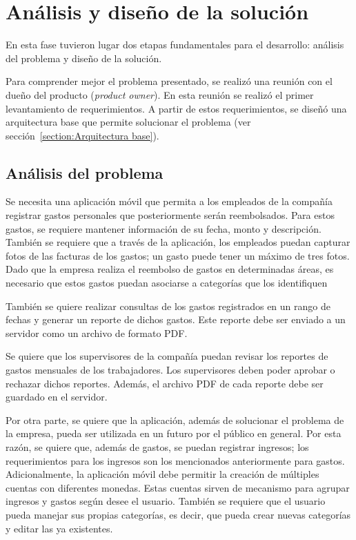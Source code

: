 \section{Análisis y diseño de la solución} \label{sect:Diseno}

En esta fase tuvieron lugar dos etapas fundamentales para el desarrollo: análisis del problema y diseño de la solución.

Para comprender mejor el problema presentado, se realizó una reunión con el dueño del producto (\textit{product owner}). En esta reunión se realizó el primer levantamiento de requerimientos. A partir de estos requerimientos, se diseñó una arquitectura base que permite solucionar el problema (ver sección~\ref{section:Arquitectura base}).

\subsection{Análisis del problema}

Se necesita una aplicación móvil que permita a los empleados de la compañía registrar gastos personales que posteriormente serán reembolsados. Para estos gastos, se requiere mantener información de su fecha, monto y descripción. También se requiere que a través de la aplicación, los empleados puedan capturar fotos de las facturas de los gastos; un gasto puede tener un máximo de tres fotos.
Dado que la empresa realiza el reembolso de gastos en determinadas áreas, es necesario que estos gastos puedan asociarse a categorías que los identifiquen

También se quiere realizar consultas de los gastos registrados en un rango de fechas y generar un reporte de dichos gastos. Este reporte debe ser enviado a un servidor como un archivo de formato PDF.

Se quiere que los supervisores de la compañía puedan revisar los reportes de gastos mensuales de los trabajadores. Los supervisores deben poder aprobar o rechazar dichos reportes. Además, el archivo PDF de cada reporte debe ser guardado en el servidor.

Por otra parte, se quiere que la aplicación, además de solucionar el problema de la empresa, pueda ser utilizada en un futuro por el público en general. Por esta razón, se quiere que, además de gastos, se puedan registrar ingresos; los requerimientos para los ingresos son los mencionados anteriormente para gastos. Adicionalmente, la aplicación móvil debe permitir la creación de múltiples cuentas con diferentes monedas. Estas cuentas sirven de mecanismo para agrupar ingresos y gastos según desee el usuario. También se requiere que el usuario pueda manejar sus propias categorías, es decir, que pueda crear nuevas categorías y editar las ya existentes.

